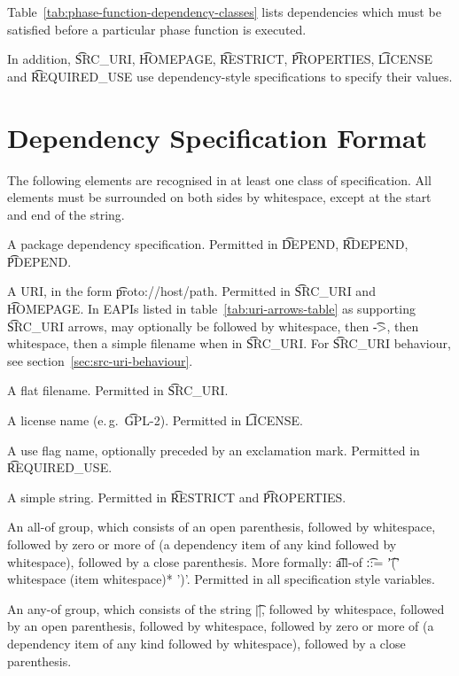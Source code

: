 Table~\ref{tab:phase-function-dependency-classes} lists dependencies which must be satisfied before
a particular phase function is executed.

In addition, \t{SRC\_URI}, \t{HOMEPAGE}, \t{RESTRICT}, \t{PROPERTIES}, \t{LICENSE} and
\t{REQUIRED\_USE} use dependency-style specifications to specify their values.

\section{Dependency Specification Format}

The following elements are recognised in at least one class of specification. All elements must
be surrounded on both sides by whitespace, except at the start and end of the string.

\begin{compactitem}
\item A package dependency specification. Permitted in \t{DEPEND}, \t{RDEPEND}, \t{PDEPEND}.
\item A URI, in the form \t{proto://host/path}. Permitted in \t{SRC\_URI} and \t{HOMEPAGE}\@.
    In EAPIs listed in table~\ref{tab:uri-arrows-table} as supporting \t{SRC\_URI} arrows, may
    optionally be followed by whitespace, then \t{->}, then whitespace, then a simple filename when
    in \t{SRC\_URI}\@. For \t{SRC\_URI} behaviour, see section~\ref{sec:src-uri-behaviour}.
\item A flat filename. Permitted in \t{SRC\_URI}.
\item A license name (e.\,g.\ \t{GPL-2}). Permitted in \t{LICENSE}.
\item A use flag name, optionally preceded by an exclamation mark. Permitted in \t{REQUIRED\_USE}.
\item A simple string. Permitted in \t{RESTRICT} and \t{PROPERTIES}.
\item An all-of group, which consists of an open parenthesis, followed by whitespace,
    followed by zero or more of (a dependency item of any kind followed by whitespace), followed
    by a close parenthesis. More formally:
    \t{all-of} \t{::=} \t{'(' whitespace (item whitespace)* ')'}. Permitted in all specification
    style variables.
\item An any-of group, which consists of the string \t{||}, followed by whitespace,
    followed by an open parenthesis, followed by whitespace, followed by zero or more
    of (a dependency item of any kind followed by whitespace), followed by a close parenthesis.

\end{compactitem}
